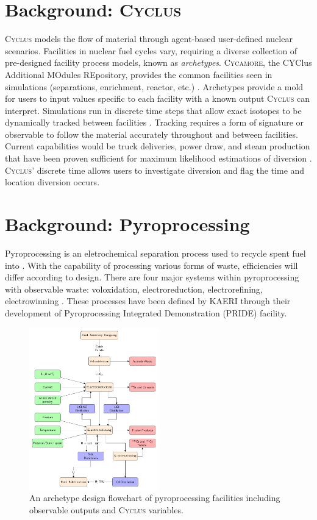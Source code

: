\documentclass{anstrans}
\newcommand{\Cyclus}{\textsc{Cyclus}\xspace}%
\newcommand{\Cycamore}{\textsc{Cycamore}\xspace}%
\begin{document}
\section{Background: \Cyclus}
\Cyclus models the flow of material through agent-based user-defined nuclear scenarios. Facilities in nuclear fuel cycles vary, 
requiring a diverse collection of pre-designed facility process models, known as \emph{archetypes}. \Cycamore, the CYClus 
Additional MOdules REpository, provides the common facilities seen in simulations (separations, enrichment, reactor, etc.)
\cite{huff_extensions_2014}. Archetypes provide a mold for users to input values specific to each facility with a known output 
\Cyclus can interpret. Simulations run in discrete time steps that allow exact isotopes to be dynamically tracked between facilities \cite{huff_fundamental_2016}. Tracking requires a form of signature or observable to follow the material accurately throughout 
and between facilities. Current capabilities would be truck deliveries, power draw, and steam production that have been proven 
sufficient for maximum likelihood estimations of diversion \cite{Hou_2016,Yilmaz_2016}.
\Cyclus' discrete time allows users to investigate diversion and flag the time and location diversion occurs.

\section{Background: Pyroprocessing}
Pyroprocessing is an eletrochemical separation process used to recycle spent fuel into . With the capability of processing 
various forms of waste, efficiencies will differ according to design. There are four major systems within pyroprocessing 
with observable waste: voloxidation, electroreduction, electrorefining, electrowinning \cite{Borrelli_2017}. These 
processes have been defined by KAERI through their development of Pyroprocessing Integrated Demonstration (PRIDE) facility. 

\begin{figure}[ht] %
	\centering
	\includegraphics[width=0.5\textwidth]{flowchart}
	\caption{An archetype design flowchart of pyroprocessing facilities including observable outputs and \Cyclus variables.}
	\label{fig:flowchart}
\end{figure}
\end{document}
